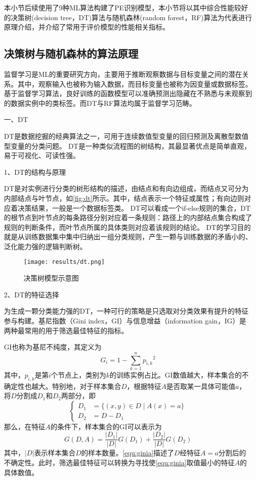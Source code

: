 本小节后续使用了9种ML算法构建了PE识别模型，本小节将以其中综合性能较好的决策树(decision tree，DT)算法与随机森林(random forest，RF)算法为代表进行原理介绍，并介绍了常用于评价模型的性能相关指标。

\subsection{决策树与随机森林的算法原理}
监督学习是ML的重要研究方向，主要用于推断观察数据与目标变量之间的潜在关系。其中，观察输入也被称为输入数据，而目标变量也被称为因变量或数据标签。
基于监督学习算法，良好训练的函数模型可以准确预测出隐藏在不熟悉与未观察到的数据实例中的类标签。而DT与RF算法均属于监督学习范畴。

一、DT

DT是数据挖掘的经典算法之一，可用于连续数值型变量的回归预测及离散型数值型变量的分类问题\cite{Li2017,Liu2018}。
DT是一种类似流程图的树结构，其最显著优点是简单直观，易于可视化、可读性强。

1、DT的结构与原理

DT是对实例进行分类的树形结构的描述，由结点和有向边组成，而结点又可分为内部结点与叶节点，如\autoref{fig:dt}所示。其中，结点表示一个特征或属性；有向边则对应着决策结果，一般是一个数据标签类\cite{Li2017,Zhou2016}。
DT可以看成一个if-else规则的集合，DT的根节点到叶节点的每条路径分别对应着一条规则：路径上的内部结点集合构成了规则的判断条件，而叶节点所属的具体类则对应着该规则的结论。
DT的学习目的就是从训练数据集中集中归纳出一组分类规则，产生一颗与训练数据的矛盾小的、泛化能力强的逻辑判断树。
\begin{figure}[htbp]
    \centering
    \texttt{[image: results/dt.png]}
    \caption{\label{fig:dt}决策树模型示意图}
\end{figure}

2、DT的特征选择

为生成一颗分类能力强的DT，一种可行的策略是只选取对分类效果有提升的特征参与构建。基尼指数（Gini index，GI）与信息增益（information gain，IG）是两种最常用的用于筛选最佳特征的指标。

GI也称为基尼不纯度，其定义为
\begin{equation}
    \label{equ:gini}
    G_i = 1 - \sum_{k=1}^n{p_{i,k}}^2
\end{equation}
其中，$p_{i,k}$是第$i$个节点上，类别为$k$的训练实例占比。GI数值越大，样本集合的不确定性也越大。特别地，对于样本集合$D$，根据特征$A$是否取某一具体可能值$a$，将$D$分割成$D_1$和$D_2$两部分，即
\begin{equation}
    \label{equ:daset}
    \left \{
    \begin{aligned}
        D_1 &= \{ (x,y) \in D \mid A(x) = a\} \\
        D_2 &= D - D_1
    \end{aligned}
    \right.
    \end{equation}
那么，在特征$A$的条件下，样本集合的GI可以表示为
\begin{equation}
    \label{equ:ginia}
    G(D,A) = \frac{|D_1|}{|D|}G(D_1) + \frac{|D_2|}{|D|}G(D_2)
\end{equation}
其中，$|D|$表示样本集合$D$的样本数量。\autoref{equ:ginia}描述了$D$经特征$A=a$分割后的不确定性。此时，筛选最佳特征可以转换为寻找使\autoref{equ:ginia}取值最小的特征$A$的具体数值。

